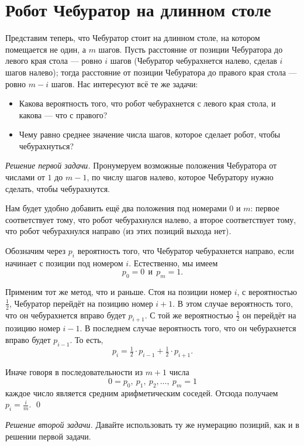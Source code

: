 \documentclass{article}
\begin{document}
\section{Робот Чебуратор на длинном столе} 

Представим теперь, что Чебуратор стоит на длинном столе, на котором помещается не один, а $m$ шагов.
Пусть расстояние от позиции Чебуратора до левого края стола --- ровно $i$ шагов (Чебуратор чебурахнется
налево, сделав $i$ шагов налево); тогда расстояние от позиции Чебуратора до правого края стола --- ровно
$m-i$ шагов. Нас интересуют всё те же задачи:

\begin{itemize}
\item Какова вероятность того, что робот чебурахнется с левого края стола, и какова --- что с правого?
\item Чему равно среднее значение числа шагов, которое сделает робот, чтобы чебурахнуться?
\end{itemize}

\medskip
\noindent\textit{Решение первой задачи.}
Пронумеруем возможные положения Чебуратора от числами от $1$ до $m-1$,
по числу шагов налево, которое Чебуратору нужно сделать, чтобы чебурахнутся.

Нам будет удобно добавить ещё два положения под номерами $0$ и $m$:
первое соответствует тому, что робот чебурахнулся налево, 
а второе соответствует тому, что робот чебурахнулся направо
(из этих позиций выхода нет).


Обозначим через $p_i$ вероятность того, что Чебуратор чебурахнется направо,
если начинает с позиции под номером $i$.
Естественно, мы имеем 
\[p_0=0\ \  \text{и}\ \  p_{m}=1.\]

Применим тот же метод, что и раньше.
Стоя на позиции номер $i$,
с вероятностью $\tfrac12$, 
Чебуратор перейдёт на позицию номер $i+1$.
В этом случае вероятность того, что он чебурахнется вправо будет $p_{i+1}$.
С той же вероятностью $\tfrac12$ он перейдёт на позицию номер $i-1$. 
В последнем случае вероятность того, что он чебурахнется вправо будет $p_{i-1}$.
То есть,
\[p_i=\tfrac12\cdot p_{i-1}+\tfrac12\cdot p_{i+1}.\]

Иначе говоря в последовательности из $m+1$ числа
\[0=p_0,\ p_1,\ p_2,\dots,\ p_{m}=1\] 
каждое число является средним арифметическим 
соседей.
Отсюда получаем $p_i=\tfrac im$.
\qed

\medskip
\noindent\textit{Решение второй задачи.}
Давайте использовать ту же нумерацию позиций, как и в решении первой задачи.
\end{document}
